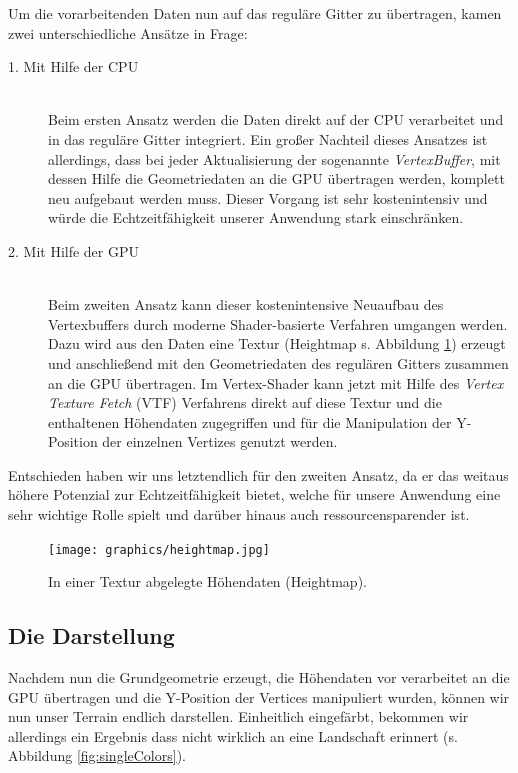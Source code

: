 \begin{Spacing}{\mylinespace}
Um die vorarbeitenden Daten nun auf das reguläre Gitter zu übertragen, kamen zwei unterschiedliche Ansätze in Frage:
\begin{description}
	\item[1. Mit Hilfe der CPU] \hfill \\
	Beim ersten Ansatz werden die Daten direkt auf der CPU verarbeitet und in das reguläre Gitter integriert. Ein großer Nachteil dieses Ansatzes ist allerdings, dass bei jeder Aktualisierung der sogenannte \textit{VertexBuffer}, mit dessen Hilfe die Geometriedaten an die GPU übertragen werden, komplett neu aufgebaut werden muss. Dieser Vorgang ist sehr kostenintensiv und würde die Echtzeitfähigkeit unserer Anwendung stark einschränken.
	\item[2. Mit Hilfe der GPU] \hfill \\
	Beim zweiten Ansatz kann dieser kostenintensive Neuaufbau des Vertexbuffers durch moderne Shader-basierte Verfahren umgangen werden. Dazu wird aus den Daten eine Textur (Heightmap s. Abbildung \ref{fig:heightmap}) erzeugt und anschließend mit den Geometriedaten des regulären Gitters zusammen an die GPU übertragen. Im Vertex-Shader kann jetzt mit Hilfe des \textit{Vertex Texture Fetch} (VTF) Verfahrens direkt auf diese Textur und die enthaltenen Höhendaten zugegriffen und für die Manipulation der Y-Position der einzelnen Vertizes genutzt werden.
\end{description}

Entschieden haben wir uns letztendlich für den zweiten Ansatz, da er das weitaus höhere Potenzial zur Echtzeitfähigkeit bietet, welche für unsere Anwendung eine sehr wichtige Rolle spielt und darüber hinaus auch ressourcensparender ist. 

\begin{figure}[h!]
	\centering
	\vspace*{20px}
	\texttt{[image: graphics/heightmap.jpg]}
	\caption{In einer Textur abgelegte Höhendaten (Heightmap).}
	\label{fig:heightmap}
\end{figure}

\subsection{Die Darstellung}
Nachdem nun die Grundgeometrie erzeugt, die Höhendaten vor verarbeitet an die GPU übertragen und die Y-Position der Vertices manipuliert wurden, können wir nun unser Terrain endlich darstellen. Einheitlich eingefärbt, bekommen wir allerdings ein Ergebnis dass nicht wirklich an eine Landschaft erinnert (s. Abbildung \ref{fig:singleColors}). 


\end{Spacing}
